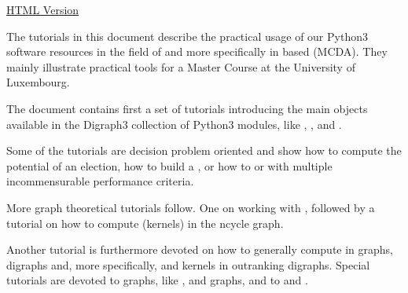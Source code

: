 \documentclass[a4paper,12pt,english]{sphinxhowto}
\begin{document}
\href{https://digraph3.readthedocs.io/en/latest/index.html}{HTML Version}
\vspace{5mm}

The tutorials in this document describe the practical usage of our  Python3 software resources in the field of  and more specifically in  based  (MCDA). They mainly illustrate practical tools for a Master Course  at the University of Luxembourg.

The document contains first a set of tutorials introducing the main objects available in the Digraph3 collection of Python3 modules, like , ,  and .

Some of the tutorials are decision problem oriented and show how to compute the potential  of an election, how to build a , or how to  or  with multiple incommensurable performance criteria.

More graph theoretical tutorials follow. One on working with , followed by a tutorial on how to compute  (kernels) in the n\sphinxhyphen{}cycle graph.

Another tutorial is furthermore devoted on how to generally compute  in graphs, digraphs and, more specifically,  and  kernels in outranking digraphs. Special tutorials are devoted to  graphs, like ,  and  graphs, and to  and .
\end{document}

